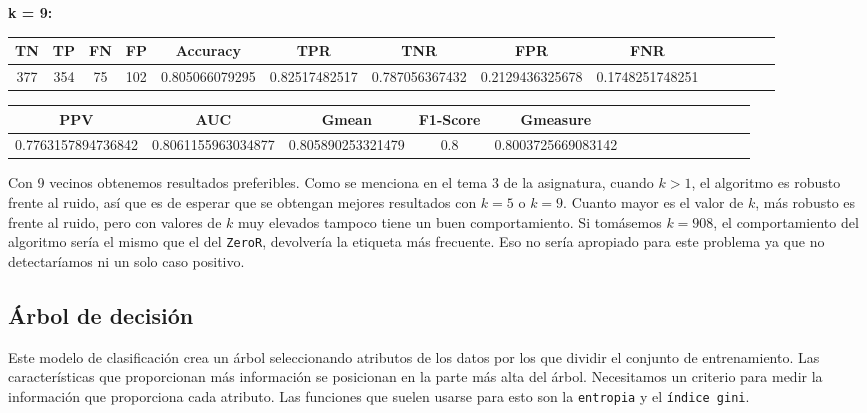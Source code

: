 \documentclass[a4]{article}
\begin{document}
\textbf{k = 9:}
\begin{center}
\begin{tabular}{|c|c|c|c|c|c|c|c|c|c|c|c|c|c|}
\hline
\multicolumn{1}{|c|}{\textbf{TN}}& \textbf{TP} & \textbf{FN} & \textbf{FP} & \textbf{Accuracy} & \textbf{TPR} & \textbf{TNR} & \textbf{FPR} &\textbf{FNR} \\ \hline
  377 & 354 & 75 & 102 & 0.805066079295 & 0.82517482517 & 0.787056367432 & 0.2129436325678 & 0.1748251748251 \\ \hline
\end{tabular}
\end{center}

\begin{center}
\begin{tabular}{|c|c|c|c|c|c|c|c|c|c|c|c|c|c|}
\hline
\multicolumn{1}{|c|}{\textbf{PPV}} & \textbf{AUC} & \textbf{Gmean} & \textbf{F1-Score} & \textbf{Gmeasure}  \\ \hline
  0.7763157894736842 & 0.8061155963034877 & 0.805890253321479 & 0.8 & 0.8003725669083142  \\ \hline
\end{tabular}
\end{center}

\vspace{5mm}

Con 9 vecinos obtenemos resultados preferibles. Como se menciona en el tema 3 de la asignatura, cuando $k > 1$, el algoritmo es robusto frente al ruido, así que es de esperar que se obtengan mejores resultados con $k = 5$ o $k = 9$. Cuanto mayor es el valor de $k$, más robusto es frente al ruido, pero con valores de $k$ muy elevados tampoco tiene un buen comportamiento. Si tomásemos $k = 908$, el comportamiento del algoritmo sería el mismo que el del \texttt{ZeroR}, devolvería la etiqueta más frecuente. Eso no sería apropiado para este problema ya que no detectaríamos ni un solo caso positivo.


\subsection{Árbol de decisión}

Este modelo de clasificación crea un árbol seleccionando atributos de los datos por los que dividir el conjunto de entrenamiento. Las características que proporcionan más información se posicionan en la parte más alta del árbol. Necesitamos un criterio para medir la información que proporciona cada atributo. Las funciones que suelen usarse para esto son la \texttt{entropia} y el \texttt{índice gini}.
\end{document}

